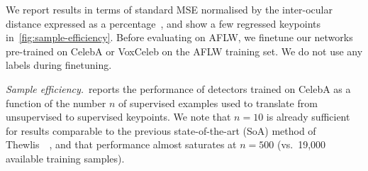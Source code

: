 \documentclass{article}
\begin{document}
We report results in terms of standard MSE normalised by the inter-ocular distance expressed as a percentage~\citep{Zhang2016}, and show a few regressed keypoints in~\cref{fig:sample-efficiency}.
Before evaluating on AFLW, we finetune our networks pre-trained on CelebA or VoxCeleb on the AFLW training set. We do not use any labels during finetuning.


\emph{Sample efficiency.}~reports the performance of detectors trained on CelebA as a function of the number $n$ of supervised examples used to translate from unsupervised to supervised keypoints. We note that $n=10$ is already sufficient for results comparable to the previous state-of-the-art (SoA) method of Thewlis~\etal~\cite{thewlis17unsupervised}, and that performance almost saturates at $n = 500$ (vs.~19,000 available training samples). %
\end{document}
